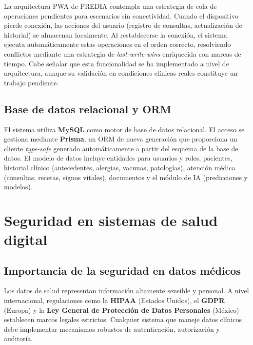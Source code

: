 \documentclass[12pt, letterpaper, twoside]{report}
\begin{document}
\begin{infobox}
La arquitectura PWA de PREDIA contempla una estrategia de cola de operaciones pendientes para escenarios sin conectividad. Cuando el dispositivo pierde conexión, las acciones del usuario (registro de consultas, actualización de historial) se almacenan localmente. Al restablecerse la conexión, el sistema ejecuta automáticamente estas operaciones en el orden correcto, resolviendo conflictos mediante una estrategia de \textit{last-write-wins} enriquecida con marcas de tiempo. Cabe señalar que esta funcionalidad se ha implementado a nivel de arquitectura, aunque su validación en condiciones clínicas reales constituye un trabajo pendiente.
\end{infobox}

\subsection{Base de datos relacional y ORM}

El sistema utiliza \textbf{MySQL} como motor de base de datos relacional. El acceso se gestiona mediante \textbf{Prisma}, un ORM de nueva generación que proporciona un cliente \textit{type-safe} generado automáticamente a partir del esquema de la base de datos. El modelo de datos incluye entidades para usuarios y roles, pacientes, historial clínico (antecedentes, alergias, vacunas, patologías), atención médica (consultas, recetas, signos vitales), documentos y el módulo de IA (predicciones y modelos).

\section{Seguridad en sistemas de salud digital}

\subsection{Importancia de la seguridad en datos médicos}

Los datos de salud representan información altamente sensible y personal. A nivel internacional, regulaciones como la \textbf{HIPAA} (Estados Unidos), el \textbf{GDPR} (Europa) y la \textbf{Ley General de Protección de Datos Personales} (México) establecen marcos legales estrictos. Cualquier sistema que maneje datos clínicos debe implementar mecanismos robustos de autenticación, autorización y auditoría.
\end{document}
